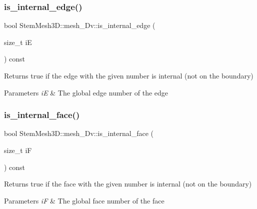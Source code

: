 \subsubsection{\texorpdfstring{is\+\_\+internal\+\_\+edge()}{is\_internal\_edge()}}
{\footnotesize\ttfamily bool Stem\+Mesh3\+D\+::mesh\+\_\+Dv\+::is\+\_\+internal\+\_\+edge (\begin{DoxyParamCaption}\item[{size\+\_\+t}]{iE }\end{DoxyParamCaption}) const}



Returns true if the edge with the given number is internal (not on the boundary) 


\begin{DoxyParams}{Parameters}
{\em iE} & The global edge number of the edge \\
\hline
\end{DoxyParams}
\mbox{\label{classStemMesh3D_1_1mesh__3Dv_a7ec74c519a65b29f52e243e4905b687d}} 
\subsubsection{\texorpdfstring{is\+\_\+internal\+\_\+face()}{is\_internal\_face()}}
{\footnotesize\ttfamily bool Stem\+Mesh3\+D\+::mesh\+\_\+Dv\+::is\+\_\+internal\+\_\+face (\begin{DoxyParamCaption}\item[{size\+\_\+t}]{iF }\end{DoxyParamCaption}) const}



Returns true if the face with the given number is internal (not on the boundary) 


\begin{DoxyParams}{Parameters}
{\em iF} & The global face number of the face \\
\hline
\end{DoxyParams}
\mbox{\label{classStemMesh3D_1_1mesh__3Dv_adaeed2f2444ec1db2b5bcc380eb38d15}} 
